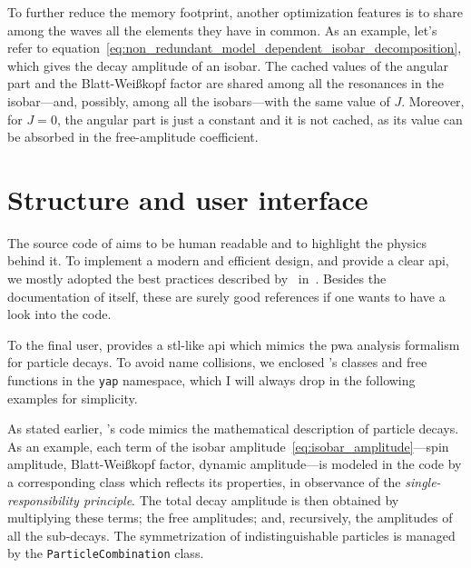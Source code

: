     To further reduce the memory footprint, another optimization  features is to share among the waves all the elements they have in common.
    As an example, let's refer to equation~\eqref{eq:non_redundant_model_dependent_isobar_decomposition}, which gives the decay amplitude of an isobar.
    The cached values of the angular part and the Blatt-Wei\ss{}kopf factor are shared among all the resonances in the isobar---and, possibly, among all the isobars---with the same value of $J$.
    Moreover, for $J = 0$, the angular part is just a constant and it is not cached, as its value can be absorbed in the free-amplitude coefficient.


    \section{Structure and user interface}

    The source code of  aims to be human readable and to highlight the physics behind it.
    To implement a modern and efficient design, and provide a clear \ac{api}, we mostly adopted the best practices described by~\citeauthor{stl_meyers} in~\cite{stl_meyers,effective_cpp_meyers,effective_modern_cpp_meyers}.
    Besides the documentation of  itself, these are surely good references if one wants to have a look into the code.


    To the final user,  provides a \ac{stl}-like \ac{api} which mimics the \ac{pwa} analysis formalism for particle decays.
    To avoid name collisions, we enclosed 's classes and free functions in the \lstinline!yap! namespace, which I will always drop in the following examples for simplicity.


    As stated earlier, 's code mimics the mathematical description of particle decays.
    As an example, each term of the isobar amplitude~\eqref{eq:isobar_amplitude}---spin amplitude, Blatt-Wei\ss{}kopf factor, dynamic amplitude---is modeled in the code by a corresponding class which reflects its properties, in observance of the \emph{single-responsibility principle}.
    The total decay amplitude is then obtained by multiplying these terms; the free amplitudes; and, recursively, the amplitudes of all the sub-decays.
    The symmetrization of indistinguishable particles is managed by the \lstinline!ParticleCombination! class.


